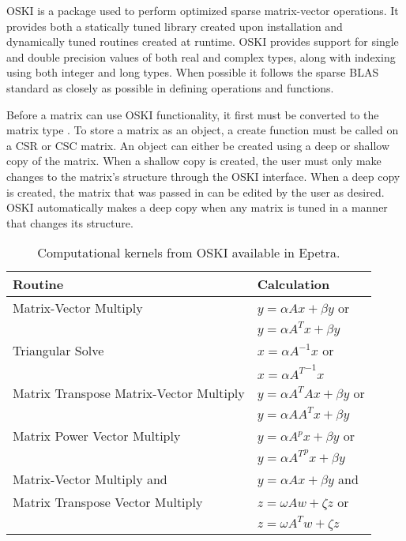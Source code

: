 OSKI is a package used to perform optimized sparse matrix-vector operations.
It provides both a statically tuned library created upon installation
and dynamically tuned routines created at runtime.
OSKI provides support for single and double
precision values of both real and complex types, along with indexing using both integer
and long types.  When possible it follows the sparse BLAS standard \cite{IK:SBLAS}
 as closely as possible in defining operations and functions.

Before a matrix can use OSKI functionality, it first must be converted to the matrix
type .  To store a matrix as an  object, a create function
must be called on a CSR or CSC matrix.  An  object can either be created using
a deep or shallow copy of the matrix.  When a shallow copy is created, the user must
only make changes to the matrix's structure through the OSKI interface.  When a deep
copy is created, the matrix that was passed in can be edited by the user as desired.
OSKI automatically makes a deep copy when any matrix is tuned in a manner that changes its structure.

\begin{table}[htbp]
\begin{center}
\begin{tabular}{|l|l|}
	\hline
Routine & Calculation  \\
	\hline
Matrix-Vector Multiply   & $y = \alpha Ax + \beta y$ or  \\
 & $y = \alpha A^Tx + \beta y$ \\ \hline
Triangular Solve   & $x = \alpha A^{-1}x$ or \\
 & $x = \alpha {A^T}^{-1}x$\\ \hline
Matrix Transpose Matrix-Vector Multiply & $y = \alpha A^TAx + \beta y$ or \\
 & $y = \alpha AA^Tx + \beta y$ \\ \hline
Matrix Power Vector Multiply  & $y = \alpha A^px + \beta y$ or \\
 & $y = \alpha {A^T}^px + \beta y$\\ \hline
Matrix-Vector Multiply and & $y = \alpha Ax + \beta y$ and \\
Matrix Transpose Vector Multiply & $z = \omega Aw + \zeta z$ or \\
 & $z = \omega A^Tw + \zeta z$ \\
	\hline
\end{tabular}
\caption{Computational kernels from OSKI available in Epetra.}
\label{IK:fig:oskikernels}
\end{center}
\end{table}

